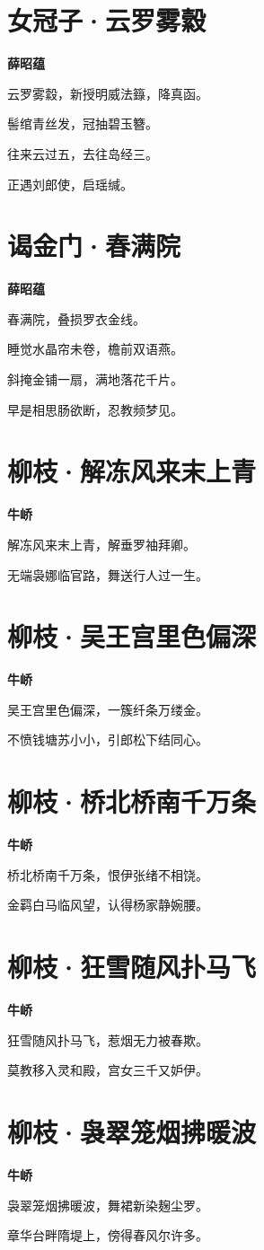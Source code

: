 \documentclass[12pt,a4paper]{ctexbook}
\begin{document}
\section{女冠子·云罗雾縠}
\textbf{薛昭蕴}\par\vspace{0.5em}
云罗雾縠，新授明威法籙，降真函。\par
髻绾青丝发，冠抽碧玉簪。\par
往来云过五，去往岛经三。\par
正遇刘郎使，启瑶缄。\par

\section{谒金门·春满院}
\textbf{薛昭蕴}\par\vspace{0.5em}
春满院，叠损罗衣金线。\par
睡觉水晶帘未卷，檐前双语燕。\par
斜掩金铺一扇，满地落花千片。\par
早是相思肠欲断，忍教频梦见。\par

\section{柳枝·解冻风来末上青}
\textbf{牛峤}\par\vspace{0.5em}
解冻风来末上青，解垂罗袖拜卿。\par
无端袅娜临官路，舞送行人过一生。\par

\section{柳枝·吴王宫里色偏深}
\textbf{牛峤}\par\vspace{0.5em}
吴王宫里色偏深，一簇纤条万缕金。\par
不愤钱塘苏小小，引郎松下结同心。\par

\section{柳枝·桥北桥南千万条}
\textbf{牛峤}\par\vspace{0.5em}
桥北桥南千万条，恨伊张绪不相饶。\par
金羁白马临风望，认得杨家静婉腰。\par

\section{柳枝·狂雪随风扑马飞}
\textbf{牛峤}\par\vspace{0.5em}
狂雪随风扑马飞，惹烟无力被春欺。\par
莫教移入灵和殿，宫女三千又妒伊。\par

\section{柳枝·袅翠笼烟拂暖波}
\textbf{牛峤}\par\vspace{0.5em}
袅翠笼烟拂暖波，舞裙新染麹尘罗。\par
章华台畔隋堤上，傍得春风尔许多。\par
\end{document}
